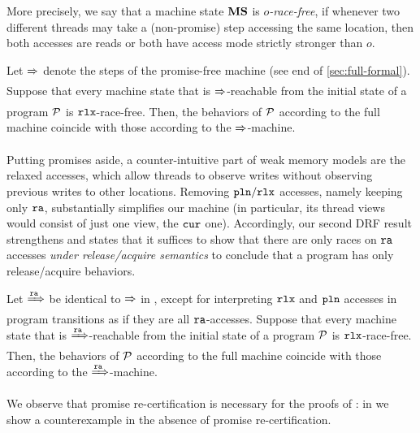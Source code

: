 More precisely, we say that a machine state ${\mathbf{MS}}$ is \emph{$o$-race-free},
if whenever two different threads may take a (non-promise) step accessing the same location,
then both accesses are reads or both have access mode strictly stronger than $o$.

\begin{theorem}
\label{thm:drfpf}
Let $\xRightarrow{}$ denote the steps of the promise-free machine 
(see end of \ref{sec:full-formal}).
Suppose that every machine state that is $\xRightarrow{}$-reachable from the initial state of a program $\mathcal{P}$ is $\texttt{rlx}$-race-free.
Then, the behaviors of $\mathcal{P}$ according to the full machine 
coincide with those according to the $\xRightarrow{}$-machine.
\end{theorem}

Putting promises aside, a counter-intuitive part of weak memory models are the relaxed accesses,
which allow threads to observe writes without observing previous writes to other locations.
Removing $\texttt{pln}/\texttt{rlx}$ accesses, namely keeping only $\texttt{ra}$, %
substantially simplifies our machine (in particular, 
its thread views would consist of just one view, the ${\texttt{cur}}$ one).
Accordingly, our second DRF result strengthens 
and states that it suffices to show
that there are only races on $\texttt{ra}$ %
accesses \emph{under release/acquire semantics} 
to conclude that a program has only release/acquire behaviors.

\begin{theorem}[DRF-RA]
\label{thm:drfra}
Let $\xRightarrow{\texttt{ra}}$ be identical to $\xRightarrow{}$ in , except for interpreting 
$\texttt{rlx}$ and $\texttt{pln}$ accesses in program transitions as if they are all $\texttt{ra}$-accesses.
Suppose that every machine state that is $\xRightarrow{\texttt{ra}}$-reachable from the initial state of a program $\mathcal{P}$ is $\texttt{rlx}$-race-free.
Then, the behaviors of $\mathcal{P}$ according to the full machine 
coincide with those according to the $\xRightarrow{\texttt{ra}}$-machine.
\end{theorem}

We observe that promise re-certification is necessary for the proofs of :
in \cite{appendix} we show a counterexample in the absence of promise re-certification.

